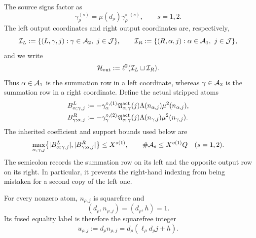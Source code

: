 The source signs factor as
\begin{equation}
 \gamma_\rho^{(s)}
 =\mu(d_\rho)\gamma_\rho^{\circ,(s)},
 \qquad s=1,2.
 \label{eq:tpc45-source-sign-strip}
\end{equation}
The left output coordinates and right output coordinates are, respectively,
\begin{equation}
 \cI_L:=\{(L,\gamma,j):\gamma\in\cA_2,\ j\in\cJ\},
 \qquad
 \cI_R:=\{(R,\alpha,j):\alpha\in\cA_1,\ j\in\cJ\},
 \label{eq:tpc45-output-indices}
\end{equation}
and we write
\begin{equation}
 \mathcal H_{\rm out}:=\ell^2(\mathcal I_L\sqcup\mathcal I_R).
 \label{eq:tpc45-output-Hilbert-space}
\end{equation}
Thus \(\alpha\in\mathcal A_1\) is the summation row in a left coordinate,
whereas \(\gamma\in\mathcal A_2\) is the summation row in a right coordinate.
Define the actual stripped atoms
\begin{align}
 B^L_{\alpha;\gamma,j}
 &:=-\gamma_\alpha^{\circ,(1)}
   \mathfrak A_{\alpha,\gamma}^{\rm act}(j)
   \Lambda(n_{\alpha,j})\mu^2(n_{\alpha,j}),
 \label{eq:tpc45-left-B}\\
 B^R_{\gamma;\alpha,j}
 &:=-\gamma_\gamma^{\circ,(2)}
   \mathfrak A_{\alpha,\gamma}^{\rm act}(j)
   \Lambda(n_{\gamma,j})\mu^2(n_{\gamma,j}).
 \label{eq:tpc45-right-B}
\end{align}
The inherited coefficient and support bounds used below are
\begin{equation}
 \max_{\alpha,\gamma,j}
 \bigl\{|B^L_{\alpha;\gamma,j}|,
        |B^R_{\gamma;\alpha,j}|\bigr\}
 \le X^{o(1)},
 \qquad
 \#\mathcal A_s\le X^{o(1)}Q\quad(s=1,2).
 \label{eq:tpc45-inherited-atom-bounds}
\end{equation}
The semicolon records the summation row on its left and the opposite
output row on its right.  In particular, it prevents the right-hand
indexing from being mistaken for a second copy of the left one.

For every nonzero atom, \(n_{\rho,j}\) is squarefree and
\begin{equation}
 (d_\rho,n_{\rho,j})=(d_\rho,h)=1.
 \label{eq:tpc45-equality-coprimality}
\end{equation}
Its fused equality label is therefore the squarefree integer
\begin{equation}
 \boxed{
 u_{\rho,j}:=d_\rho n_{\rho,j}
 =d_\rho(\ell_\rho d_\rho j+h).}
 \label{eq:tpc45-actual-label}
\end{equation}

